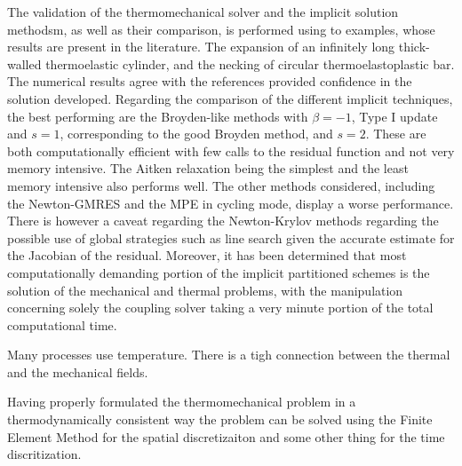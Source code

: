 The validation of the thermomechanical solver and the implicit solution methodsm, as well as their comparison, is performed using to examples, whose results are present in the literature.
The expansion of an infinitely long thick-walled thermoelastic cylinder, and the necking of circular thermoelastoplastic bar.
The numerical results agree with the references provided confidence in the solution developed.
Regarding the comparison of the different implicit techniques, the best performing are the Broyden-like methods with \(\beta=-1\), Type I update and \(s=1\), corresponding to the good Broyden method, and \(s=2\).
These are both computationally efficient with few calls to the residual function and not very memory intensive.
The Aitken relaxation being the simplest and the least memory intensive also performs well.
The other methods considered, including the Newton-GMRES and the MPE in cycling mode, display a worse performance.
There is however a caveat regarding the Newton-Krylov methods regarding the possible use of global strategies such as line search given the accurate estimate for the Jacobian of the residual.
Moreover, it has been determined that most computationally demanding portion of the implicit partitioned schemes is the solution of the mechanical and thermal problems, with the manipulation concerning solely the coupling solver taking a very minute portion of the total computational time.




Many processes use temperature.
There is a tigh connection between the thermal and the mechanical fields.

Having properly formulated the thermomechanical problem in a thermodynamically consistent way the problem can be solved using the Finite Element Method for the spatial discretizaiton and some other thing for the time discritization.

